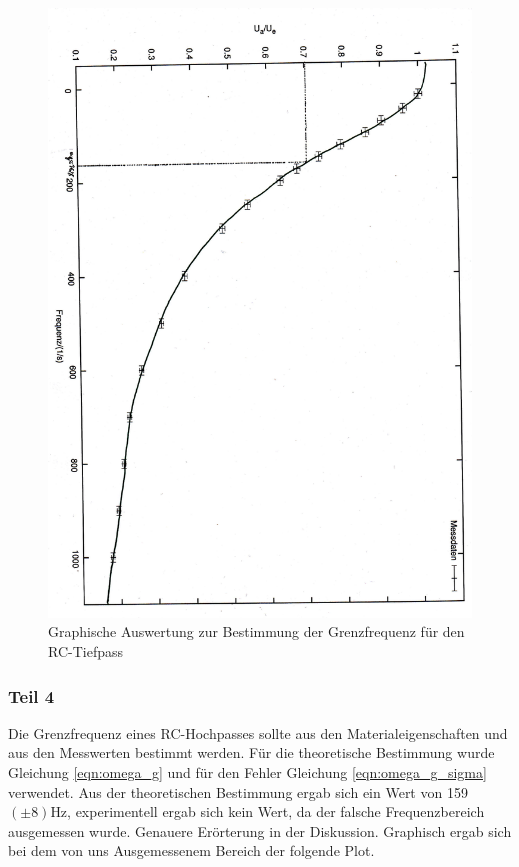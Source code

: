 \documentclass[12pt]{scrartcl}
\begin{document}
\begin{figure}[htbp] 
  \centering
    \includegraphics[scale = 0.5, angle = 90]{teil_3.pdf}
  	\caption[Graphische Auswertung zur Bestimmung der Grenzfrequenz für den RC-Tiefpass]{Graphische Auswertung zur Bestimmung der Grenzfrequenz für den RC-Tiefpass}
  \label{fig:Hochpass}
\end{figure}

\newpage

\subsubsection{Teil 4}
Die Grenzfrequenz eines RC-Hochpasses sollte aus den Materialeigenschaften und aus den Messwerten bestimmt werden. Für die theoretische Bestimmung wurde Gleichung \ref{eqn:omega_g} und für den Fehler Gleichung \ref{eqn:omega_g_sigma} verwendet.
Aus der theoretischen Bestimmung ergab sich ein Wert von 159 $(\pm 8)$Hz, experimentell ergab sich kein Wert, da der falsche Frequenzbereich ausgemessen wurde. Genauere Erörterung in der Diskussion. Graphisch ergab sich bei dem von uns Ausgemessenem Bereich der folgende Plot.
\end{document}
